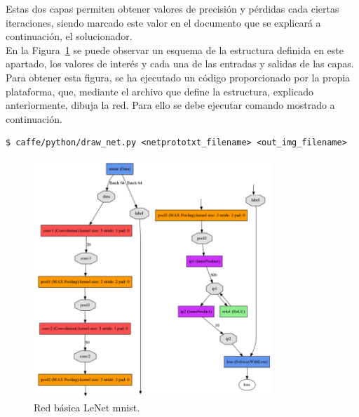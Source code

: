 	Estas dos capas permiten obtener valores de precisión y pérdidas cada ciertas iteraciones, siendo marcado este valor en el documento que se explicará a continuación, el solucionador.\\

	En la Figura~\ref{fig.redBasica} se puede observar un esquema de la estructura definida en este apartado, los valores de interés y cada una de las entradas y salidas de las capas. Para obtener esta figura, se ha ejecutado un código proporcionado por la propia plataforma, que, mediante el archivo que define la estructura, explicado anteriormente, dibuja la red. Para ello se debe ejecutar comando mostrado a continuación.
	\vspace{10pt}
	\begin{lstlisting}[frame=single]
	$ caffe/python/draw_net.py <netprototxt_filename> <out_img_filename>
	\end{lstlisting}
	
	\begin{figure}[H]
		\begin{center}
			\includegraphics[width=0.8\textwidth]{figures/Original_net}
			\caption{Red básica LeNet \acrshort{mnist}.}
			\label{fig.redBasica}
		\end{center}
	\end{figure}
	
